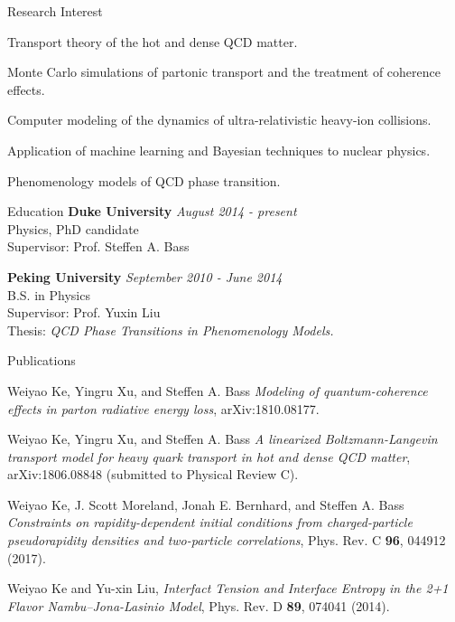 \documentclass{resume} %
\begin{document}
\begin{rSection}{Research Interest}
\vspace{.3em}
\begin{Article}
\item Transport theory of the hot and dense QCD matter.
\vspace{.3em}
\item Monte Carlo simulations of partonic transport and the treatment of coherence effects.
\vspace{.3em}
\item Computer modeling of the dynamics of ultra-relativistic heavy-ion collisions.
\vspace{.3em}
\item Application of machine learning and Bayesian techniques to nuclear physics.
\vspace{.3em}
\item Phenomenology models of QCD phase transition.
\end{Article}
\end{rSection}


\begin{rSection}{Education}
{\bf Duke University} \hfill {\em August 2014 - present} \\ 
Physics, PhD candidate \\
Supervisor: Prof. Steffen A. Bass

{\bf Peking University} \hfill {\em September 2010 - June 2014} \\ 
B.S. in Physics \\
Supervisor: Prof. Yuxin Liu \\
Thesis: {\it QCD Phase Transitions in Phenomenology Models. }
\end{rSection}

\begin{rSection}{Publications}
\vspace{.3em}
\begin{Article}
\item Weiyao Ke, Yingru Xu, and Steffen A. Bass {\it Modeling of quantum-coherence effects in parton radiative energy loss}, arXiv:1810.08177.
\vspace{.3em}
\item Weiyao Ke, Yingru Xu, and Steffen A. Bass {\it A linearized Boltzmann-Langevin transport model for heavy quark transport in hot and dense QCD matter}, arXiv:1806.08848 (submitted to Physical Review C).
\vspace{.3em}
\item Weiyao Ke, J. Scott Moreland, Jonah E. Bernhard, and Steffen A. Bass {\it Constraints on rapidity-dependent initial conditions from charged-particle pseudorapidity densities and two-particle correlations}, Phys. Rev. C {\bf 96}, 044912 (2017).
\vspace{.3em}
\item Weiyao Ke and Yu-xin Liu, {\it Interfact Tension and Interface Entropy in the 2+1 Flavor Nambu--Jona-Lasinio Model}, Phys. Rev. D {\bf 89}, 074041 (2014).
\end{Article}
\end{rSection}
\end{document}
